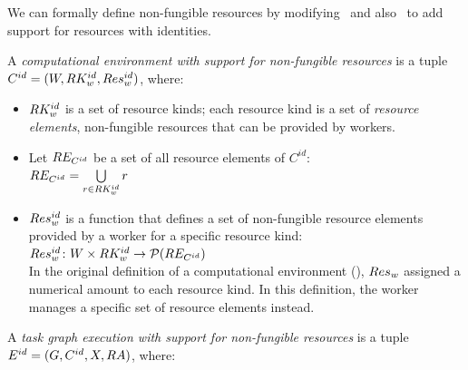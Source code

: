 We can formally define non-fungible resources by modifying~ and
also~ to add support for resources with identities.

\vspace{2mm} A \emph{computational environment with support for non-fungible resources} is a tuple
$C^{id} = (W, RK_w^{id}, Res_w^{id})$, where:
\begin{itemize}[itemsep=0pt]
	\item $RK_w^{id}$ is a set of resource kinds; each resource kind is a set of
	      \emph{resource elements}, non-fungible resources that can be provided by workers.
	\item Let $RE_{C^{id}}$ be a set of all resource elements of $C^{id}$: \\
	      $RE_{C^{id}} = \bigcup\limits_{r\in RK_w^{id}} r$
	\item $Res_w^{id}$ is a function that defines a set of non-fungible resource elements
		  provided by a worker for a specific resource kind: \\ $Res_w^{id}\colon W \times RK_w^{id} \rightarrow \mathcal{P}(RE_{C^{id}})$\vspace{2mm}\\
		  In the original definition of a computational environment (), $Res_w$ assigned a numerical
		  amount to each resource kind. In this  definition, the worker manages a specific set
		  of resource elements instead.
\end{itemize}

\vspace{2mm} A \emph{task graph execution with support for
non-fungible resources} is a tuple $E^{id} = (G, C^{id}, X,
	RA)$, where:


